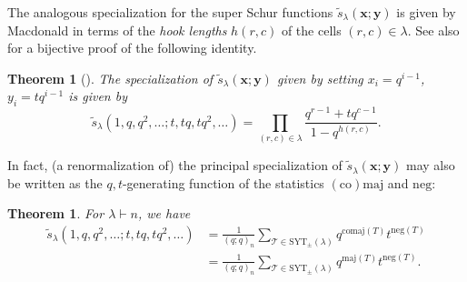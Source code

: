 \documentclass[11pt]{article}
\newtheorem{thm}[theo]{Theorem}
\theoremstyle{definition}
\numberwithin{equation}{section}
\newcommand\comaj{\mathrm{comaj}}
\newcommand\maj{\mathrm{maj}}
\newcommand\negg{\mathrm{neg}}
\newcommand\SYT{\mathrm{SYT}}
\newcommand\xb{\mathbf{x}}
\newcommand\yb{\mathbf{y}}
\newcommand\stil{\tilde{s}}
\begin{document}
The analogous specialization for the super Schur functions $\stil_\lambda(\xb;\yb)$ is given by Macdonald in terms of the \emph{hook lengths} $h(r,c)$ of the cells $(r,c) \in \lambda$. See also \cite{Kratt} for a bijective proof of the following identity.
\begin{thm}[{\cite[p.~27, Ex.~5 and p.~45, Ex.~3]{Mac}}]\label{qt-hook}
   The specialization of $\stil_\lambda(\xb;\yb)$ given by setting $x_i = q^{i-1}$, $y_i = tq^{i-1}$ is given by
   \[
   \stil_\lambda(1,q,q^2,\ldots;t,tq,tq^2,\ldots) = \prod_{(r,c) \in \lambda} \frac{q^{r-1} + tq^{c-1}}{1 - q^{h(r,c)}}.
   \]
\end{thm}
In fact, (a renormalization of) the principal specialization of $\stil_\lambda(\xb;\yb)$ may also be written as the $q,t$-generating function of the statistics $\mathrm{(co)maj}$ and $\negg$:
\begin{thm}\label{thm:s-ps}
For $\lambda \vdash n$, we have
\begin{align*}
 \stil_\lambda(1,q,q^2,\ldots;t,tq,tq^2,\ldots)
   &= \frac{1}{(q;q)_n} \sum_{\mathcal{T} \in \SYT_\pm(\lambda)} q^{\comaj(T)} t^{\negg(T)} \\
   &= \frac{1}{(q;q)_n} \sum_{\mathcal{T} \in \SYT_\pm(\lambda)} q^{\maj(T)} t^{\negg(T)}.
\end{align*}
\end{thm}
\end{document}
